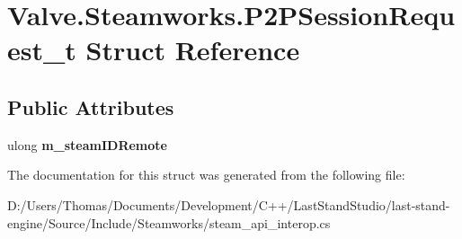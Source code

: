 \hypertarget{structValve_1_1Steamworks_1_1P2PSessionRequest__t}{}\section{Valve.\+Steamworks.\+P2\+P\+Session\+Request\+\_\+t Struct Reference}
\label{structValve_1_1Steamworks_1_1P2PSessionRequest__t}
\subsection*{Public Attributes}
\begin{DoxyCompactItemize}
\item 
\hypertarget{structValve_1_1Steamworks_1_1P2PSessionRequest__t_aafd188db5b48ca4aacd43760a9b1cefa}{}ulong {\bfseries m\+\_\+steam\+I\+D\+Remote}\label{structValve_1_1Steamworks_1_1P2PSessionRequest__t_aafd188db5b48ca4aacd43760a9b1cefa}

\end{DoxyCompactItemize}


The documentation for this struct was generated from the following file\+:\begin{DoxyCompactItemize}
\item 
D\+:/\+Users/\+Thomas/\+Documents/\+Development/\+C++/\+Last\+Stand\+Studio/last-\/stand-\/engine/\+Source/\+Include/\+Steamworks/steam\+\_\+api\+\_\+interop.\+cs\end{DoxyCompactItemize}
